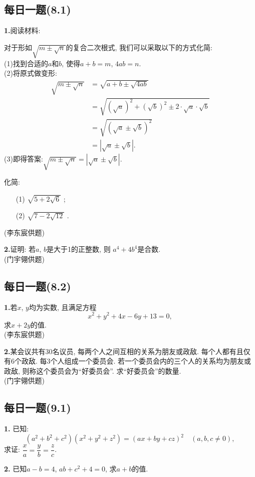 \documentclass{article}
\begin{document}
{\centering\subsection*{每日一题(8.1)}}
\textbf{1.}阅读材料:
{\kaishu
	\par 对于形如$\sqrt{m\pm\sqrt{n}}$的复合二次根式, 我们可以采取以下的方式化简: \\
	(1)\quad 找到合适的$a$和$b$, 使得$a+b=m$, $4ab=n$.\\
	(2)\quad 将原式做变形:
	\begin{align*}
		\sqrt{m\pm\sqrt{n}}&=\sqrt{a+b\pm\sqrt{4ab}}\\
		&=\sqrt{\left(\sqrt{a}\right)^2+\left(\sqrt{b}\right)^2\pm2\cdot\sqrt{a}\cdot\sqrt{b}}\\
		&=\sqrt{\left(\sqrt{a}\pm\sqrt{b}\right)^2}\\
		&=\left|\sqrt{a}\pm\sqrt{b}\right|.
	\end{align*}
	(3)\quad 即得答案:$\sqrt{m\pm\sqrt{n}}=\left|\sqrt{a}\pm\sqrt{b}\right|$.
}
\par 化简: 
\begin{itemize}
	\item[(1)]$\sqrt{5+2\sqrt{6}}$ ; 
	\item[(2)]$\sqrt{7-2\sqrt{12}}$ . 
\end{itemize}
{\kaishu (李东宸供题)}\\
\par \textbf{2.}证明: 若$a$, $b$是大于1的正整数, 则 $a^4+4b^4$是合数.\\
{\kaishu (门宇翎供题)} 

{\centering\subsection*{每日一题(8.2)}}
\textbf{1.}若$x$, $y$均为实数, 且满足方程
\[x^2+y^2+4x-6y+13=0,\]
求$x+2y$的值.\\
{\kaishu (李东宸供题)}\\

\par\textbf{2.}某会议共有30名议员, 每两个人之间互相的关系为朋友或政敌. 每个人都有且仅有6个政敌. 每3个人组成一个委员会. 若一个委员会内的三个人的关系均为朋友或政敌, 则称这个委员会为“好委员会”. 求“好委员会”的数量. \\
{\kaishu (门宇翎供题)}

{\centering\subsection*{每日一题(9.1)}}
\textbf{1. }已知:
\[\left(a^2+b^2+c^2\right)\left(x^2+y^2+z^2\right)=(ax+by+cz)^2\quad(a,b,c\neq0),\]
求证: $\dfrac{x}{a}=\dfrac{y}{b}=\dfrac{z}{c}$.\\\par
\textbf{2. }已知$a-b=4$, $ab+c^2+4=0$, 求$a+b$的值.\\
\end{document}
